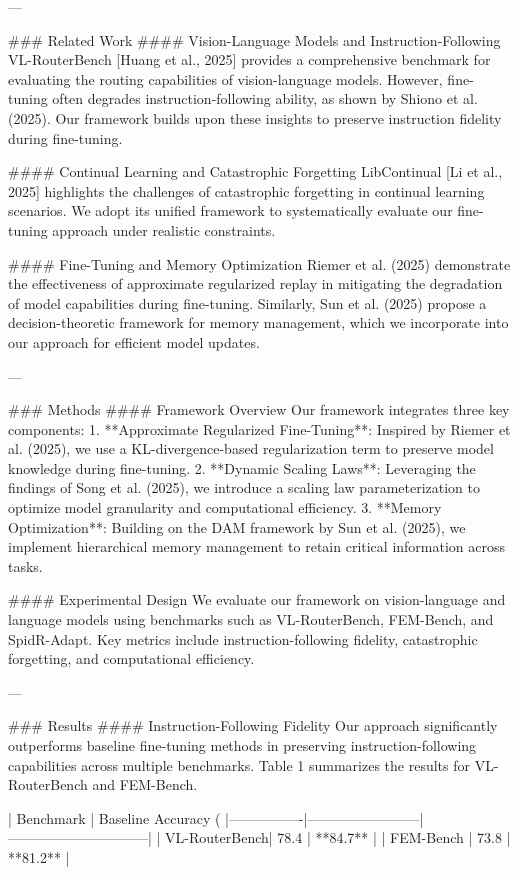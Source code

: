 ---

### Related Work
#### Vision-Language Models and Instruction-Following
VL-RouterBench [Huang et al., 2025] provides a comprehensive benchmark for evaluating the routing capabilities of vision-language models. However, fine-tuning often degrades instruction-following ability, as shown by Shiono et al. (2025). Our framework builds upon these insights to preserve instruction fidelity during fine-tuning.

#### Continual Learning and Catastrophic Forgetting
LibContinual [Li et al., 2025] highlights the challenges of catastrophic forgetting in continual learning scenarios. We adopt its unified framework to systematically evaluate our fine-tuning approach under realistic constraints.

#### Fine-Tuning and Memory Optimization
Riemer et al. (2025) demonstrate the effectiveness of approximate regularized replay in mitigating the degradation of model capabilities during fine-tuning. Similarly, Sun et al. (2025) propose a decision-theoretic framework for memory management, which we incorporate into our approach for efficient model updates.

---

### Methods
#### Framework Overview
Our framework integrates three key components: 
1. **Approximate Regularized Fine-Tuning**: Inspired by Riemer et al. (2025), we use a KL-divergence-based regularization term to preserve model knowledge during fine-tuning.
2. **Dynamic Scaling Laws**: Leveraging the findings of Song et al. (2025), we introduce a scaling law parameterization to optimize model granularity and computational efficiency.
3. **Memory Optimization**: Building on the DAM framework by Sun et al. (2025), we implement hierarchical memory management to retain critical information across tasks.

#### Experimental Design
We evaluate our framework on vision-language and language models using benchmarks such as VL-RouterBench, FEM-Bench, and SpidR-Adapt. Key metrics include instruction-following fidelity, catastrophic forgetting, and computational efficiency.

---

### Results
#### Instruction-Following Fidelity
Our approach significantly outperforms baseline fine-tuning methods in preserving instruction-following capabilities across multiple benchmarks. Table 1 summarizes the results for VL-RouterBench and FEM-Bench.

| Benchmark      | Baseline Accuracy (%
|----------------|------------------------|------------------------------|
| VL-RouterBench| 78.4                  | **84.7**                    |
| FEM-Bench      | 73.8                  | **81.2**                    |

